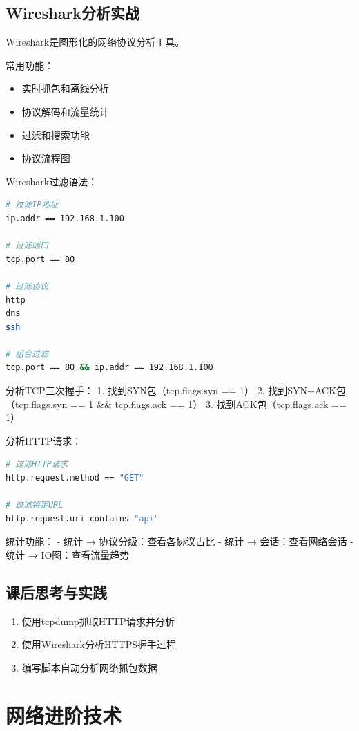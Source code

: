 \documentclass[12pt,UTF8]{ctexbook}
\begin{document}
\section{Wireshark分析实战}
\label{sec:wireshark}

Wireshark是图形化的网络协议分析工具。

常用功能：
\begin{itemize}
    \item 实时抓包和离线分析
    \item 协议解码和流量统计
    \item 过滤和搜索功能
    \item 协议流程图
\end{itemize}

Wireshark过滤语法：
\begin{lstlisting}[language=bash]
# 过滤IP地址
ip.addr == 192.168.1.100

# 过滤端口
tcp.port == 80

# 过滤协议
http
dns
ssh

# 组合过滤
tcp.port == 80 && ip.addr == 192.168.1.100
\end{lstlisting}

分析TCP三次握手：
1. 找到SYN包（tcp.flags.syn == 1）
2. 找到SYN+ACK包（tcp.flags.syn == 1 \&\& tcp.flags.ack == 1）
3. 找到ACK包（tcp.flags.ack == 1）

分析HTTP请求：
\begin{lstlisting}[language=bash]
# 过滤HTTP请求
http.request.method == "GET"

# 过滤特定URL
http.request.uri contains "api"
\end{lstlisting}

统计功能：
- 统计 → 协议分级：查看各协议占比
- 统计 → 会话：查看网络会话
- 统计 → IO图：查看流量趋势

\section{课后思考与实践}
\label{sec:packet-practice}
\begin{enumerate}
    \item 使用tcpdump抓取HTTP请求并分析
    \item 使用Wireshark分析HTTPS握手过程
    \item 编写脚本自动分析网络抓包数据
\end{enumerate}

\chapter{网络进阶技术}
\label{chap:network-advanced}
\end{document}
